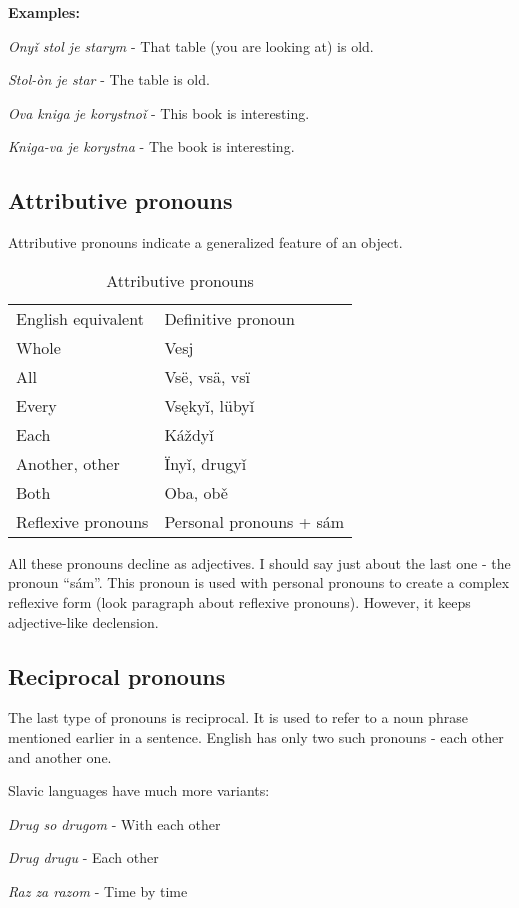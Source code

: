 \textbf{Examples:}

\textit{Onyǐ stol je starym} - That table (you are looking at) is old.

\textit{Stol-òn je star} - The table is old.

\textit{Ova kniga je korystnoǐ} - This book is interesting.

\textit{Kniga-va je korystna} - The book is interesting.

\subsection{Attributive pronouns}

Attributive pronouns indicate a generalized feature of an object. 

\begin{table}[!htb]
	\caption{Attributive pronouns}
	\begin{tabular}{ll}
		English equivalent & Definitive pronoun \\
		Whole & Vesj \\
		All & Vsë, vsä, vsï \\
		Every & Vsękyǐ, lübyǐ \\
		Each & Káždyǐ \\
		Another, other & Ïnyǐ, drugyǐ \\
		Both & Oba, obě \\
		Reflexive pronouns & Personal pronouns + sám
	\end{tabular}
\end{table}

All these pronouns decline as adjectives. I should say just about the last one - the pronoun “sám”. This pronoun is used with personal pronouns to create a complex reflexive form (look paragraph about reflexive pronouns). However, it keeps adjective-like declension.

\subsection{Reciprocal pronouns}


The last type of pronouns is reciprocal. It is used to refer to a noun phrase mentioned earlier in a sentence. English has only two such pronouns - each other and another one.

Slavic languages have much more variants:

\textit{Drug so drugom} - With each other

\textit{Drug drugu} - Each other

\textit{Raz za razom} - Time by time

